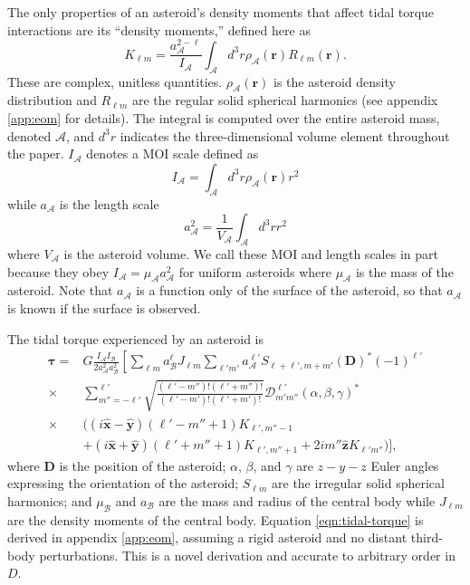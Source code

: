 \documentclass[fleqn,usenatbib]{mnras}
\renewcommand{\unit}[1]{\bm{\hat{#1}}}
\begin{document}
The only properties of an asteroid's density moments that affect tidal torque interactions are its ``density moments,'' defined here as
\begin{equation}
  K_{\ell m} = \frac{a_\mathcal{A}^{2-\ell}}{I_\mathcal{A}} \int_\mathcal{A} d^3 r \rho_\mathcal{A}(\bm r) R_{\ell m}(\bm r).
  \label{eqn:klm}
\end{equation}
These are complex, unitless quantities. $\rho_\mathcal{A}(\bm r)$ is the asteroid density distribution and $R_{\ell m}$ are the regular solid spherical harmonics (see appendix \ref{app:eom} for details). The integral is computed over the entire asteroid mass, denoted $\mathcal{A}$, and $d^3 r$ indicates the three-dimensional volume element throughout the paper. $I_\mathcal{A}$ denotes a MOI scale defined as 
\begin{equation}
  I_\mathcal{A} = \int_\mathcal{A} d^3 r \rho_\mathcal{A}(\bm r) r^2
  \label{eqn:ia}
\end{equation}
while $a_\mathcal{A}$ is the length scale
\begin{equation}
  a_\mathcal{A}^2 = \frac{1}{V_\mathcal{A}} \int_\mathcal{A} d^3 r r^2
  \label{eqn:aa}
\end{equation}
where $V_\mathcal{A}$ is the asteroid volume. We call these MOI and length scales in part because they obey $I_\mathcal{A} = \mu_\mathcal{A} a_\mathcal{A}^2$ for uniform asteroids where $\mu_\mathcal{A}$ is the mass of the asteroid. Note that $a_\mathcal{A}$ is a function only of the surface of the asteroid, so that $a_\mathcal{A}$ is known if the surface is observed.

The tidal torque experienced by an asteroid is 
\begin{equation}
  \begin{split}
  \bm \tau = & G\frac{I_\mathcal{A}I_\mathcal{B}}{2 a_\mathcal{A}^2a_\mathcal{B}^2}\left[\sum_{\ell m} a_\mathcal{B}^\ell J_{\ell m} \sum_{\ell' m'}a_\mathcal{A}^{\ell'}S_{\ell+\ell', m + m'} (\bm D)^* (-1)^{\ell'}\right.\\
  \times & \left.\sum_{m''=-\ell'}^{\ell'} \sqrt{\frac{(\ell'-m'')!(\ell'+m'')!}{(\ell'-m')!(\ell'+m')!}}  \mathcal{D}^{\ell'}_{m'm''}(\alpha, \beta, \gamma)^* \right. \\
  \times & \Big((i\unit x - \unit y)(\ell'-m''+1)K_{\ell',m''-1} \\
  & +(i\unit x+\unit y)(\ell'+m''+1)K_{\ell',m''+1}+2im''\unit z K_{\ell'm''}\Big) \Bigg],
  \end{split}
  \label{eqn:tidal-torque}
\end{equation}
where $\bm D$ is the position of the asteroid; $\alpha$, $\beta$, and $\gamma$ are $z-y-z$ Euler angles expressing the orientation of the asteroid; $S_{\ell m}$ are the irregular solid spherical harmonics; and $\mu_\mathcal{B}$ and $a_\mathcal{B}$ are the mass and radius of the central body while $J_{\ell m}$ are the density moments of the central body. Equation \ref{eqn:tidal-torque} is derived in appendix \ref{app:eom}, assuming a rigid asteroid and no distant third-body perturbations. This is a novel derivation and accurate to arbitrary order in $D$.
\end{document}
